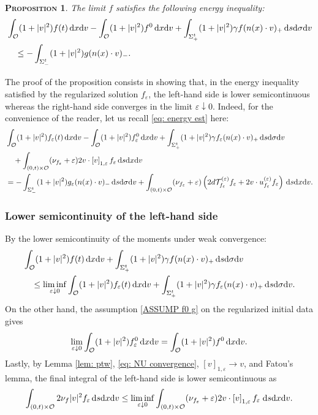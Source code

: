 \documentclass[10pt, reqno]{amsart}
\theoremstyle{plain}
\newtheorem{proposition}[theorem]{\normalfont \scshape Proposition}
\theoremstyle{definition}
\theoremstyle{remark}
\numberwithin{equation}{section}
\newcommand{\calO}{\mathcal O}
\newcommand{\calT}{\mathcal T}
\newcommand{\ve}{\varepsilon}
\newcommand{\dx}{\textnormal{d}x}
\newcommand{\dv}{\textnormal{d}v}
\newcommand{\ds}{\textnormal{d}s}
\newcommand{\tnd}{\textnormal{d}}
\newcommand{\lt}{\left}
\newcommand{\rt}{\right}
\newcommand{\renorm}[3]{\lt[#1\rt]_{#2 , #3}}
\begin{document}
\begin{proposition} \label{prop: energy}
    The limit $f$ satisfies the following energy inequality:
    \begin{align*}
        &\int_{\calO} (1+|v|^2) f(t) \,\dx\dv - \int_{\calO} (1+|v|^2) f^0 \,\dx\dv + \int_{\Sigma_+^t} (1+|v|^2) \gamma f (n(x)\cdot v)_+ \,\ds\tnd\sigma\dv \\
    &\quad\le -\int_{\Sigma_-^t} (1+|v|^2) g (n(x)\cdot v)_-.
    \end{align*}
\end{proposition}
The proof of the proposition consists in showing that, in the energy inequality satisfied by the regularized solution $f_\ve$, the left-hand side is lower semicontinuous whereas the right-hand side converges in the limit $\ve\downarrow 0$. Indeed, for the convenience of the reader, let us recall \eqref{eq: energy est} here:
\begin{equation} \label{eq: recall EGY}
\begin{split}
    &\int_{\calO} (1+|v|^2) f_\ve(t) \,\dx\dv - \int_{\calO} (1+|v|^2) f_\ve^0 \,\dx\dv + \int_{\Sigma_+^t} (1+|v|^2) \gamma f_\ve (n(x)\cdot v)_+ \,\ds\tnd\sigma\dv \\
    &\quad + \int_{(0,t)\times \calO} (\nu_{f_\ve} + \ve) 2v\cdot \renorm{v}{1}{\ve} f_\ve  \,\ds\dx\dv \\
    &= - \int_{\Sigma_-^t} (1+|v|^2) g_\ve (n(x)\cdot v)_- \,\ds\tnd\sigma\dv+ \int_{(0,t)\times \calO} (\nu_{f_\ve} + \ve) \lt(2 d \calT_{f_\ve}^{(\ve)} f_\ve + 2 v \cdot u_{f_\ve}^{(\ve)} f_\ve \rt) \,\ds\dx\dv.
\end{split}
\end{equation}
%
%
%
%
%
%
\subsubsection{Lower semicontinuity of the left-hand side}
By the lower semicontinuity of the moments under weak convergence:
\begin{align*}
    &\int_{\calO}(1+|v|^2) f(t) \,\dx\dv + \int_{\Sigma_+^t} (1+|v|^2) \gamma f (n(x)\cdot v)_+ \,\ds\tnd\sigma\dv\\
    &\quad \le \liminf_{\ve\downarrow 0} \int_{\calO} (1+|v|^2) f_\ve(t) \,\dx\dv + \int_{\Sigma_+^t} (1+|v|^2) \gamma f_\ve (n(x)\cdot v)_+ \,\ds\tnd\sigma\dv.
\end{align*}
On the other hand, the assumption \eqref{ASSUMP f0 g} on the regularized initial data gives
\begin{align*}
    \lim_{\ve\downarrow 0} \int_{\calO} (1+|v|^2) f_\ve^0 \,\dx\dv = \int_{\calO} (1+|v|^2) f^0 \,\dx\dv.
\end{align*}
Lastly, by Lemma \ref{lem: ptw}, \eqref{eq: NU convergence}, $\renorm{v}{1}{\ve}\to v$, and Fatou's lemma, the final integral of the left-hand side is lower semicontinuous as
\begin{align*}
    \int_{(0,t)\times \calO} 2\nu_f |v|^2 f_\ve \,\ds\dx\dv \le \liminf_{\ve\downarrow 0} \int_{(0,t)\times\calO} (\nu_{f_\ve} + \ve) 2v\cdot \renorm{v}{1}{\ve} f_\ve \;\ds\dx\dv.
\end{align*}
%
%
%
%
%
%
\end{document}

